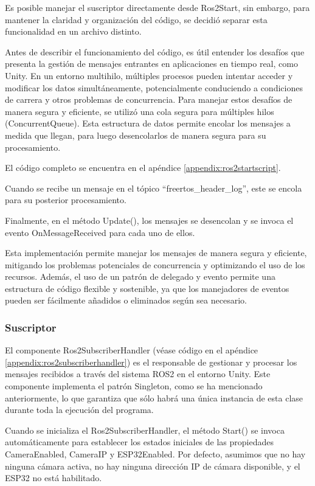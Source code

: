 Es posible manejar el suscriptor directamente desde Ros2Start, sin embargo, para mantener la claridad y organización del código, se decidió separar esta funcionalidad en un archivo distinto.



Antes de describir el funcionamiento del código, es útil entender los desafíos que presenta la gestión de mensajes entrantes en aplicaciones en tiempo real, como Unity. En un entorno multihilo, múltiples procesos pueden intentar acceder y modificar los datos simultáneamente, potencialmente conduciendo a condiciones de carrera y otros problemas de concurrencia. Para manejar estos desafíos de manera segura y eficiente, se utilizó una cola segura para múltiples hilos (ConcurrentQueue). Esta estructura de datos permite encolar los mensajes a medida que llegan, para luego desencolarlos de manera segura para su procesamiento.

El código completo se encuentra en el apéndice \ref{appendix:ros2startscript}.

Cuando se recibe un mensaje en el tópico ``freertos\_header\_log'', este se encola para su posterior procesamiento.


Finalmente, en el método Update(), los mensajes se desencolan y se invoca el evento OnMessageReceived para cada uno de ellos.


Esta implementación permite manejar los mensajes de manera segura y eficiente, mitigando los problemas potenciales de concurrencia y optimizando el uso de los recursos. Además, el uso de un patrón de delegado y evento permite una estructura de código flexible y sostenible, ya que los manejadores de eventos pueden ser fácilmente añadidos o eliminados según sea necesario.

\subsubsection{Suscriptor}
\label{subsection:subscriptor}
El componente Ros2SubscriberHandler (véase código en el apéndice \ref{appendix:ros2subscriberhandler}) es el responsable de gestionar y procesar los mensajes recibidos a través del sistema ROS2 en el entorno Unity. Este componente implementa el patrón Singleton, como se ha mencionado anteriormente, lo que garantiza que sólo habrá una única instancia de esta clase durante toda la ejecución del programa.

Cuando se inicializa el Ros2SubscriberHandler, el método Start() se invoca automáticamente para establecer los estados iniciales de las propiedades CameraEnabled, CameraIP y ESP32Enabled. Por defecto, asumimos que no hay ninguna cámara activa, no hay ninguna dirección IP de cámara disponible, y el ESP32 no está habilitado.


